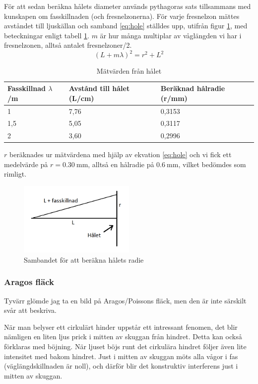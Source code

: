 \documentclass[a4paper]{article}
\begin{document}
För att sedan beräkna hålets diameter används pythagoras sats tillsammans med kunskapen om fasskillnaden (och fresnelzonerna).
För varje fresnelzon mättes avståndet till ljuskällan och samband \ref{eq:hole} ställdes upp, utifrån figur \ref{fig:fasskillnad}, 
med beteckningar enligt tabell \ref{tab:hole}. $m$ är hur många multiplar av våglängden vi har i fresnelzonen, alltså antalet fresnelzoner/2.
\begin{equation}
	(L + m\lambda)^2 = r^2 + L^2
	\label{eq:hole}
\end{equation}

\begin{table}[h!]
	\centering
	\begin{tabular}{|l|l|l|}
	\hline
	Fasskillnad $\lambda$/m & Avstånd till hålet (L/cm) & Beräknad hålradie (r/mm) \\ \hline
	1                                 & 7,76                      & 0,3153                   \\ \hline
	1,5                               & 5,05                      & 0,3117                   \\ \hline
	2                                 & 3,60                      & 0,2996                   \\ \hline
	\end{tabular}
	\caption{Mätvärden från hålet}
	\label{tab:hole}
\end{table}
$r$ beräknades ur mätvärdena med hjälp av ekvation \ref{eq:hole} och vi fick ett medelvärde på $r=\SI{0.30}{\milli\meter}$, alltså
en hålradie på $\SI{0.6}{\milli\meter}$, vilket bedömdes som rimligt.
\begin{figure}
	\centering
	\includegraphics[width=0.5\textwidth]{fasskillnad.png}
	\caption{Sambandet för att beräkna hålets radie}
	\label{fig:fasskillnad}
\end{figure}
\subsubsection{Aragos fläck}
Tyvärr glömde jag ta en bild på Aragos/Poissons fläck, men den är inte särskilt svår att beskriva.

När man belyser ett cirkulärt hinder uppstår ett intressant fenomen, det blir nämligen en liten ljus prick i mitten av skuggan från hindret.
Detta kan också förklaras med böjning. När ljuset böjs runt det cirkulära hindret följer även lite intensitet med bakom hindret. Just i mitten
av skuggan möts alla vågor i fas (väglängdskillnaden är noll), och därför blir det konstruktiv interferens just i mitten av skuggan.
\end{document}
